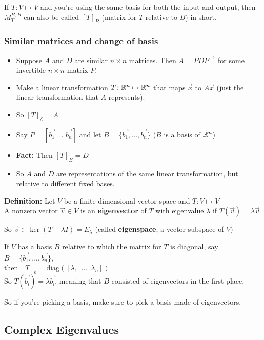 If $T \colon V \mapsto V$ and you're using the same basis for both the input and output, then $M_T^{B,B}$ can also be called $[T]_B$ (matrix for $T$ relative to $B$) in short.

\subsubsection*{Similar matrices and change of basis}

\begin{itemize}
    \item Suppose $A$ and $D$ are similar $n \times n$ matrices. Then $A = PDP^{-1}$ for some invertible $n \times n$ matrix $P$.
    \item Make a linear transformation $T \colon \mathbb{R}^n \mapsto \mathbb{R}^n$ that maps $\Vec x$ to $A\Vec x$ (just the linear transformation that $A$ represents).
    \item So $[T]_{\mathcal{E}} = A$
    \item Say $P = \left[\Vec{b_1}\,\,...\,\,\Vec{b_n}\right]$ and let $B = \{\Vec{b_1}, ..., \Vec{b_n}\}$ ($B$ is a basis of $\mathbb{R}^n$)
    \item \textbf{Fact:} Then $[T]_B = D$
    \item So $A$ and $D$ are representations of the same linear transformation, but relative to different fixed bases.
\end{itemize}

\textbf{Definition:} Let $V$ be a finite-dimensional vector space and $T \colon V \mapsto V$\\
A nonzero vector $\Vec{v} \in V$ is an \textbf{eigenvector} of $T$ with eigenvalue $\lambda$ if $T(\Vec{v}) = \lambda\Vec{v}$

So $\Vec{v} \in \ker(T - \lambda I) = E_{\lambda}$ (called \textbf{eigenspace}, a vector subspace of $V$)

If $V$ has a basis $B$ relative to which the matrix for $T$ is diagonal, say $B = \{\Vec{b_1}, ..., \Vec{b_n}\}$,\\
then $[T]_b = \mathrm{diag}([\lambda_1 \,\,\, ... \,\,\, \lambda_n])$\\
So $T(\Vec{b_i}) = \lambda\Vec{b_i}$, meaning that $B$ consisted of eigenvectors in the first place.

So if you're picking a basis, make sure to pick a basis made of eigenvectors.

\subsection{Complex Eigenvalues}

